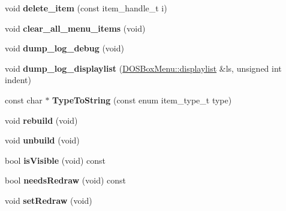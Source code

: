 \begin{DoxyCompactItemize}
\item 
\hypertarget{classDOSBoxMenu_a66810c47f6c38cad0065086346e5a942}{void {\bfseries delete\-\_\-item} (const item\-\_\-handle\-\_\-t i)}\label{classDOSBoxMenu_a66810c47f6c38cad0065086346e5a942}

\item 
\hypertarget{classDOSBoxMenu_a15a44769ffae60ad7bd668f5061c3762}{void {\bfseries clear\-\_\-all\-\_\-menu\-\_\-items} (void)}\label{classDOSBoxMenu_a15a44769ffae60ad7bd668f5061c3762}

\item 
\hypertarget{classDOSBoxMenu_a8f7a54b37f829da1fdbee1303a2e8eec}{void {\bfseries dump\-\_\-log\-\_\-debug} (void)}\label{classDOSBoxMenu_a8f7a54b37f829da1fdbee1303a2e8eec}

\item 
\hypertarget{classDOSBoxMenu_aacbca39765fa87eb1fafc23d0baee08a}{void {\bfseries dump\-\_\-log\-\_\-displaylist} (\hyperlink{classDOSBoxMenu_1_1displaylist}{D\-O\-S\-Box\-Menu\-::displaylist} \&ls, unsigned int indent)}\label{classDOSBoxMenu_aacbca39765fa87eb1fafc23d0baee08a}

\item 
\hypertarget{classDOSBoxMenu_aa1a69d38685375499edb2a216c0e4de3}{const char $\ast$ {\bfseries Type\-To\-String} (const enum item\-\_\-type\-\_\-t type)}\label{classDOSBoxMenu_aa1a69d38685375499edb2a216c0e4de3}

\item 
\hypertarget{classDOSBoxMenu_ab9470c7c4f3232879364506f12fb98d4}{void {\bfseries rebuild} (void)}\label{classDOSBoxMenu_ab9470c7c4f3232879364506f12fb98d4}

\item 
\hypertarget{classDOSBoxMenu_a347a11ce92b601705de7f3402986f76c}{void {\bfseries unbuild} (void)}\label{classDOSBoxMenu_a347a11ce92b601705de7f3402986f76c}

\item 
\hypertarget{classDOSBoxMenu_a5e1e04ef1fe9fe6366cc126e931827c2}{bool {\bfseries is\-Visible} (void) const }\label{classDOSBoxMenu_a5e1e04ef1fe9fe6366cc126e931827c2}

\item 
\hypertarget{classDOSBoxMenu_a5e8d3d67c1041ee5860bb50951e4b732}{bool {\bfseries needs\-Redraw} (void) const }\label{classDOSBoxMenu_a5e8d3d67c1041ee5860bb50951e4b732}

\item 
\hypertarget{classDOSBoxMenu_a3e1adc65b9e048ba62adbfeaf6bd6cec}{void {\bfseries set\-Redraw} (void)}\label{classDOSBoxMenu_a3e1adc65b9e048ba62adbfeaf6bd6cec}


\end{DoxyCompactItemize}
